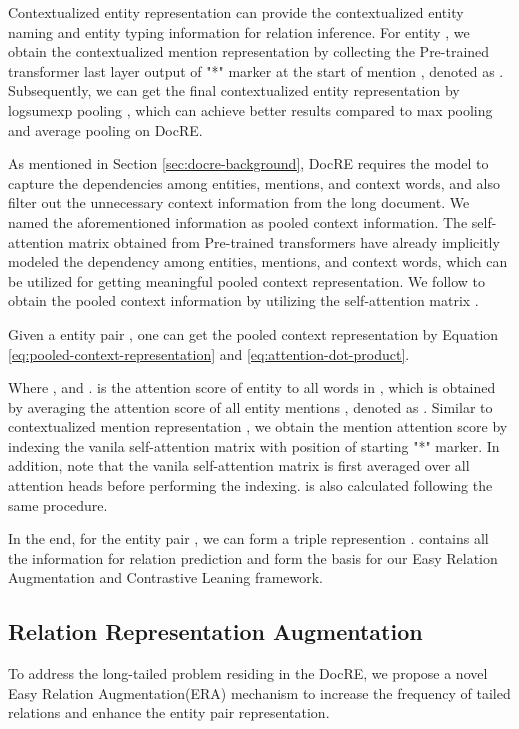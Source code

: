 \documentclass[11pt]{article}
\begin{document}
    Contextualized entity representation can provide the contextualized entity naming and entity typing information for relation inference. For entity , we obtain the contextualized mention representation by collecting the Pre-trained transformer last layer output of "*" marker at the start of mention , denoted as . Subsequently, we can get the final contextualized entity representation  by logsumexp pooling \citep{jia-etal-2019-document}, which can achieve better results compared to max pooling and average pooling on DocRE\citep{zhou_atlop_2021}.
    
    
    As mentioned in Section \ref{sec:docre-background}, DocRE requires the model to capture the dependencies among entities, mentions, and context words, and also filter out the unnecessary context information from the long document. We named the aforementioned information as pooled context information. The self-attention matrix  obtained from Pre-trained transformers have already implicitly modeled the dependency among entities, mentions, and context words, which can be utilized for getting meaningful pooled context representation\citep{zhou_atlop_2021}. We follow \citet{zhou_atlop_2021} to obtain the pooled context information by utilizing the self-attention matrix .
    
    Given a entity pair , one can get the pooled context representation  by Equation \ref{eq:pooled-context-representation} and \ref{eq:attention-dot-product}.
    
    
    
    Where , and .  is the attention score of entity  to all words in , which is obtained by averaging the attention score of all entity mentions , denoted as . Similar to contextualized mention representation , we obtain the mention attention score  by indexing the vanila self-attention matrix  with position of starting "*" marker. In addition, note that the vanila self-attention matrix is first averaged over all attention heads before performing the indexing.  is also calculated following the same procedure.
    
    In the end, for the entity pair , we can form a triple represention .  contains all the information for relation prediction and form the basis for our Easy Relation Augmentation and Contrastive Leaning framework.
    
\subsection{Relation Representation Augmentation}
    \label{sec:era-relation-aug}
     To address the long-tailed problem residing in the DocRE, we propose a novel Easy Relation Augmentation(ERA) mechanism to increase the frequency of tailed relations and enhance the entity pair representation.
    
\end{document}
